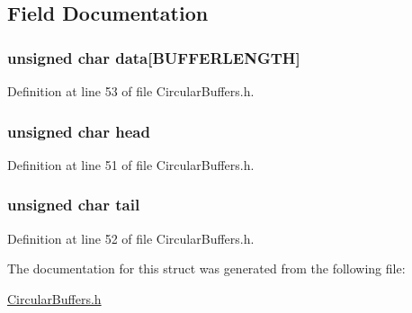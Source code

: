 \subsection{Field Documentation}
\hypertarget{structcircular_buffer_ad7b57ba90694482456be1fbab7de4aec}{
\subsubsection[{data}]{\setlength{\rightskip}{0pt plus 5cm}unsigned char data\mbox{[}{\bf B\+U\+F\+F\+E\+R\+L\+E\+N\+G\+T\+H}\mbox{]}}}\label{structcircular_buffer_ad7b57ba90694482456be1fbab7de4aec}


Definition at line 53 of file Circular\+Buffers.\+h.

\hypertarget{structcircular_buffer_a47f7e6109597e5c1c227993c0ce5f560}{
\subsubsection[{head}]{\setlength{\rightskip}{0pt plus 5cm}unsigned char head}}\label{structcircular_buffer_a47f7e6109597e5c1c227993c0ce5f560}


Definition at line 51 of file Circular\+Buffers.\+h.

\hypertarget{structcircular_buffer_af18a1d7542e277284c4794593b049258}{
\subsubsection[{tail}]{\setlength{\rightskip}{0pt plus 5cm}unsigned char tail}}\label{structcircular_buffer_af18a1d7542e277284c4794593b049258}


Definition at line 52 of file Circular\+Buffers.\+h.



The documentation for this struct was generated from the following file\+:\begin{DoxyCompactItemize}
\item 
\hyperlink{_circular_buffers_8h}{Circular\+Buffers.\+h}\end{DoxyCompactItemize}
